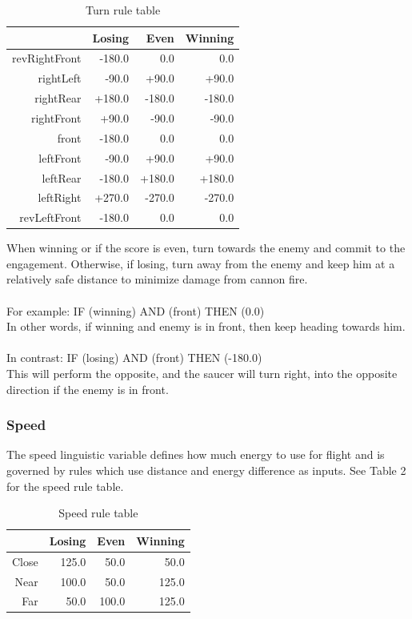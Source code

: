 \begin{table}[H]
\centering
\caption{Turn rule table}
\label{Turn rule table}
\begin{tabular}{r|r|r|r}
 				& Losing 	& Even 		& Winning 	\\ \hline
revRightFront	& -180.0	& 0.0		& 0.0 		\\
rightLeft		& -90.0		& +90.0		& +90.0		\\
rightRear		& +180.0	& -180.0	& -180.0 	\\
rightFront		& +90.0		& -90.0 	& -90.0 	\\
front 			& -180.0	& 0.0 		& 0.0 		\\
leftFront 		& -90.0		& +90.0 	& +90.0		\\
leftRear 		& -180.0	& +180.0 	& +180.0 	\\
leftRight 		& +270.0	& -270.0 	& -270.0 	\\
revLeftFront 	& -180.0	& 0.0 		& 0.0 		\\
\end{tabular}
\end{table}

When winning or if the score is even, turn towards the enemy and commit to the engagement. Otherwise, if losing, turn away from the enemy and keep him at a relatively safe distance to minimize damage from cannon fire.
\\
\\
For example: IF (winning) AND (front) THEN (0.0)
\\
In other words, if winning and enemy is in front, then keep heading towards him.
\\
\\
In contrast: IF (losing) AND (front) THEN (-180.0)
\\
This will perform the opposite, and the saucer will turn right, into the opposite direction if the enemy is in front.

\subsubsection{Speed}

The speed linguistic variable defines how much energy to use for flight and is governed by rules which use distance and energy difference as inputs. See Table 2 for the speed rule table.

\begin{table}[H]
\centering
\caption{Speed rule table}
\label{Speed rule table}
\begin{tabular}{r|r|r|r}
 		& Losing & Even & Winning \\ \hline
Close	& 125.0 & 50.0 	& 50.0 \\
Near	& 100.0 & 50.0 	& 125.0 \\
Far		& 50.0 	& 100.0 & 125.0 \\
\end{tabular}
\end{table}

